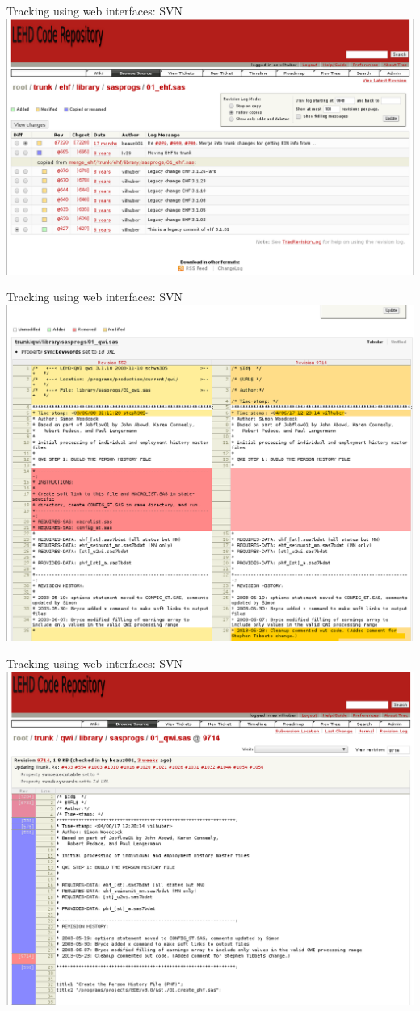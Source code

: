 \documentclass[xcolor=table,compress]{beamer}
\begin{document}
\begin{frame}{Tracking using web interfaces: SVN}
\includegraphics[width=.9\textwidth]{trac-svn-view2.png}
\end{frame}

\begin{frame}{Tracking using web interfaces: SVN}
\includegraphics[width=.9\textwidth]{trac-svn-view3.png}
\end{frame}

\begin{frame}{Tracking using web interfaces: SVN}
\includegraphics[width=.9\textwidth]{trac-svn-view4.png}
\end{frame}
\end{document}
